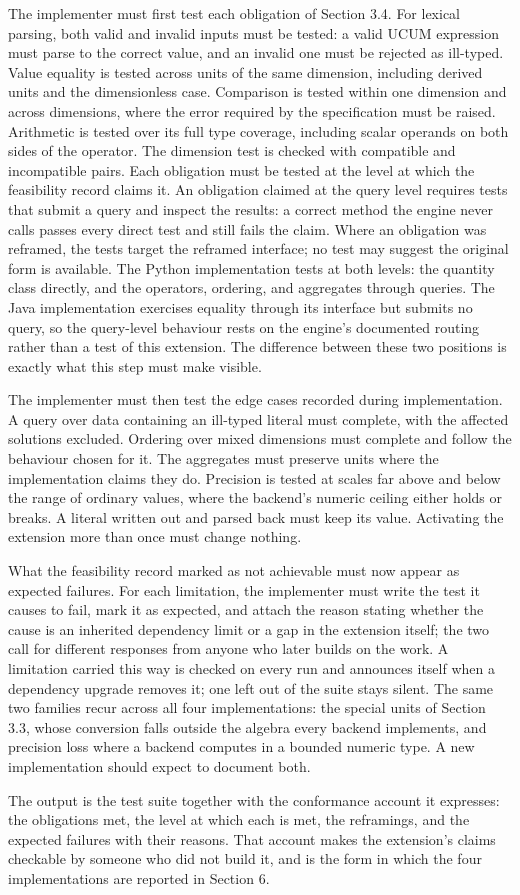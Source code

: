The implementer must first test each obligation of Section 3.4. For lexical parsing, both valid and invalid inputs must be tested: a valid UCUM expression must parse to the correct value, and an invalid one must be rejected as ill-typed. Value equality is tested across units of the same dimension, including derived units and the dimensionless case. Comparison is tested within one dimension and across dimensions, where the error required by the specification must be raised. Arithmetic is tested over its full type coverage, including scalar operands on both sides of the operator. The dimension test is checked with compatible and incompatible pairs.
Each obligation must be tested at the level at which the feasibility record claims it. An obligation claimed at the query level requires tests that submit a query and inspect the results: a correct method the engine never calls passes every direct test and still fails the claim. Where an obligation was reframed, the tests target the reframed interface; no test may suggest the original form is available. The Python implementation tests at both levels: the quantity class directly, and the operators, ordering, and aggregates through queries. The Java implementation exercises equality through its interface but submits no query, so the query-level behaviour rests on the engine's documented routing rather than a test of this extension. The difference between these two positions is exactly what this step must make visible.

The implementer must then test the edge cases recorded during implementation. A query over data containing an ill-typed literal must complete, with the affected solutions excluded. Ordering over mixed dimensions must complete and follow the behaviour chosen for it. The aggregates must preserve units where the implementation claims they do. Precision is tested at scales far above and below the range of ordinary values, where the backend's numeric ceiling either holds or breaks. A literal written out and parsed back must keep its value. Activating the extension more than once must change nothing.

What the feasibility record marked as not achievable must now appear as expected failures. For each limitation, the implementer must write the test it causes to fail, mark it as expected, and attach the reason stating whether the cause is an inherited dependency limit or a gap in the extension itself; the two call for different responses from anyone who later builds on the work. A limitation carried this way is checked on every run and announces itself when a dependency upgrade removes it; one left out of the suite stays silent. The same two families recur across all four implementations: the special units of Section 3.3, whose conversion falls outside the algebra every backend implements, and precision loss where a backend computes in a bounded numeric type. A new implementation should expect to document both.

The output is the test suite together with the conformance account it expresses: the obligations met, the level at which each is met, the reframings, and the expected failures with their reasons. That account makes the extension's claims checkable by someone who did not build it, and is the form in which the four implementations are reported in Section 6.